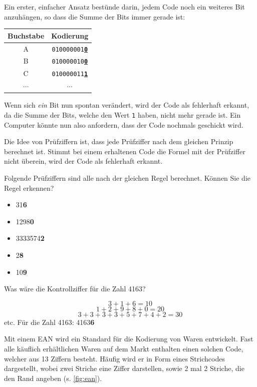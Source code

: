 Ein erster, einfacher Ansatz bestünde darin, jedem Code noch ein weiteres Bit anzuhängen, so dass die Summe der Bits immer gerade ist:

\begin{table}[H]
    \centering
    \begin{tabular}{c|c}
        Buchstabe & Kodierung                                \\\midrule\midrule
        A         & \texttt{010000001\underline{\textbf{0}}} \\\midrule
        B         & \texttt{010000010\underline{\textbf{0}}} \\\midrule
        C         & \texttt{010000011\underline{\textbf{1}}} \\\midrule
        $\cdots$  & $\cdots$
    \end{tabular}
\end{table}

Wenn sich \textit{ein} Bit nun spontan verändert, wird der Code als fehlerhaft erkannt, da die Summe der Bits, welche den Wert \texttt{1} haben, nicht mehr gerade ist. Ein Computer könnte nun also anfordern, dass der Code nochmals geschickt wird.

Die Idee von Prüfziffern ist, dass jede Prüfziffer nach dem gleichen Prinzip berechnet ist. Stimmt bei einem erhaltenen Code die Formel mit der Prüfziffer nicht überein, wird der Code als fehlerhaft erkannt.
\begin{myexercise}
    Folgende Prüfziffern sind alle nach der gleichen Regel berechnet. Können Sie die Regel erkennen?
    \begin{itemize}
        \item 31\textbf{6}
        \item 1298\textbf{0}
        \item 3333574\textbf{2}
        \item 2\textbf{8}
        \item 10\textbf{9}
    \end{itemize}
    Was wäre die Kontrollziffer für die Zahl 4163?

    \begin{myanswer}
        \[3 + 1 + 6 = 10\]
        \[1 + 2 + 9 + 8 + 0 = 20\]
        \[3 + 3 + 3 + 3 + 5 + 7 + 4 + 2=30\]
        etc.
        Für die Zahl 4163: 4163\textbf{6}
    \end{myanswer}
\end{myexercise}

Mit einem \gls{EAN} wird ein Standard für die Kodierung von Waren entwickelt. Fast alle käuflich erhältlichen Waren auf dem Markt enthalten einen solchen Code, welcher aus 13 Ziffern besteht. Häufig wird er in Form eines Strichcodes dargestellt, wobei zwei Striche eine Ziffer darstellen, sowie 2 mal 2 Striche, die den Rand angeben (s. \cref{fig:ean}).

